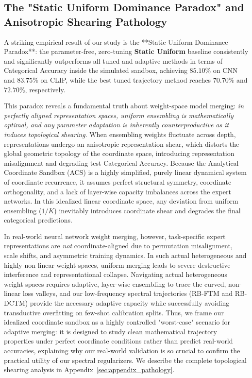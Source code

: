 \subsection{The "Static Uniform Dominance Paradox" and Anisotropic Shearing Pathology}
\label{sec:experiments_dominance_paradox}
A striking empirical result of our study is the **Static Uniform Dominance Paradox**: the parameter-free, zero-tuning \textbf{Static Uniform} baseline consistently and significantly outperforms all tuned and adaptive methods in terms of Categorical Accuracy inside the simulated sandbox, achieving $85.10\%$ on CNN and $83.75\%$ on CLIP, while the best tuned trajectory method reaches $70.70\%$ and $72.70\%$, respectively. 

This paradox reveals a fundamental truth about weight-space model merging: \emph{in perfectly aligned representation spaces, uniform ensembling is mathematically optimal, and any parameter adaptation is inherently counterproductive as it induces topological shearing}. When ensembling weights fluctuate across depth, representations undergo an anisotropic representation shear, which distorts the global geometric topology of the coordinate space, introducing representation misalignment and degrading test Categorical Accuracy. Because the Analytical Coordinate Sandbox (ACS) is a highly simplified, purely linear dynamical system of coordinate recurrence, it assumes perfect structural symmetry, coordinate orthogonality, and a lack of layer-wise capacity imbalances across the expert networks. In this idealized linear coordinate space, any deviation from uniform ensembling ($1/K$) inevitably introduces coordinate shear and degrades the final categorical predictions.

In real-world neural network weight merging, however, task-specific expert representations are \emph{not} coordinate-aligned due to permutation misalignment, scale shifts, and asymmetric training dynamics. In such actual heterogeneous and highly non-linear weight spaces, uniform merging leads to severe destructive interference and representational collapse. Navigating actual heterogeneous weight spaces requires adaptive, layer-wise ensembling to trace the curved, non-linear loss valleys, and our low-frequency spectral trajectories (RB-FTM and RB-DCTM) provide the necessary adaptive capacity while successfully avoiding transductive overfitting on few-shot calibration splits. Thus, we frame our idealized coordinate sandbox as a highly controlled "worst-case" scenario for adaptive merging: it is designed to study clean mathematical trajectory properties under perfect coordinate conditions rather than predict real-world accuracies, explaining why our real-world validation is so crucial to confirm the practical utility of our spectral regularizers. We describe the complete topological shearing analysis in Appendix~\ref{sec:appendix_pathology}.

